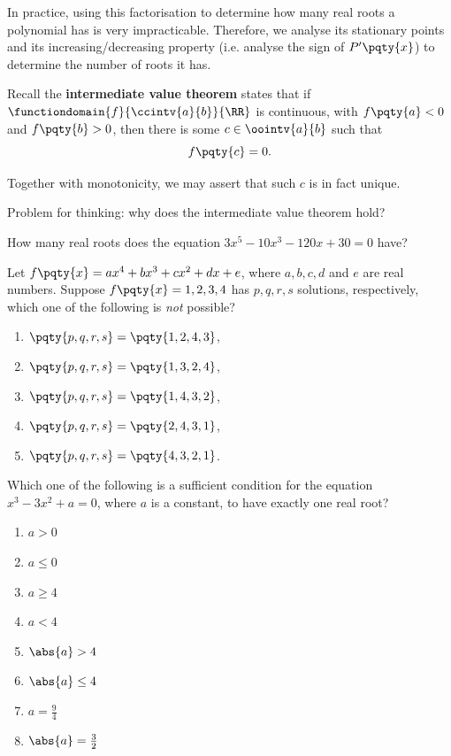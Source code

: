\documentclass{article}
\begin{document}
In practice, using this factorisation to determine how many real roots a polynomial has is very impracticable. Therefore, we analyse its stationary points and its increasing/decreasing property (i.e. analyse the sign of \(P'\pqty{x}\)) to determine the number of roots it has.

Recall the \textbf{intermediate value theorem} states that if \(\functiondomain{f}{\ccintv{a}{b}}{\RR}\) is continuous, with \(f\pqty{a} < 0\) and \(f\pqty{b} > 0\), then there is some \(c \in \oointv{a}{b}\) such that
\[
    f\pqty{c} = 0.
\]

Together with monotonicity, we may assert that such \(c\) is in fact unique.

\begin{problem}
    Problem for thinking: why does the intermediate value theorem hold?
\end{problem}

\begin{example}[TMUA 2016 P1 Q13]
    How many real roots does the equation \(3 x^5 - 10 x^3 - 120 x + 30 = 0\) have?
\end{example}

\begin{example}[TMUA 2016 P2 Q14]
    Let \(f\pqty{x} = a x^4 + b x^3 + c x^2 + d x + e\), where \(a, b, c, d\) and \(e\) are real numbers. Suppose \(f\pqty{x} = 1, 2, 3, 4\) has \(p, q, r, s\) solutions, respectively, which one of the following is \emph{not} possible?
    \begin{enumerate}
        \item \(\pqty{p, q, r, s} = \pqty{1, 2, 4, 3}\),
        \item \(\pqty{p, q, r, s} = \pqty{1, 3, 2, 4}\),
        \item \(\pqty{p, q, r, s} = \pqty{1, 4, 3, 2}\),
        \item \(\pqty{p, q, r, s} = \pqty{2, 4, 3, 1}\),
        \item \(\pqty{p, q, r, s} = \pqty{4, 3, 2, 1}\).
    \end{enumerate}
\end{example}

\begin{example}[TMUA 2017 P2 Q19]
    Which one of the following is a sufficient condition for the equation \(x^3 - 3 x^2 + a = 0\), where \(a\) is a constant, to have exactly one real root?
    \begin{enumerate}
        \item \(a > 0\)
        \item \(a \leq 0\)
        \item \(a \geq 4\)
        \item \(a < 4\)
        \item \(\abs{a} > 4\)
        \item \(\abs{a} \leq 4\)
        \item \(a = \frac{9}{4}\)
        \item \(\abs{a} = \frac{3}{2}\)
    \end{enumerate}
\end{example}
\end{document}
